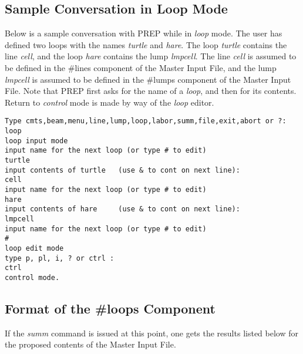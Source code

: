 \subsection{Sample Conversation in Loop Mode} Below is a sample
conversation with PREP while in {\em loop} mode. The user has defined two
loops with the names {\em turtle} and {\em hare}. The loop {\em turtle }
contains the line {\em cell}, and the loop {\em hare} contains the lump
{\em lmpcell}. The line {\em cell} is assumed to be defined in the \#lines
component of the Master Input File, and the lump {\em lmpcell} is assumed
to be defined in the \#lumps component of the Master Input File. Note that
PREP first asks for the name of a {\em loop}, and then for its contents.
Return to {\em control} mode is made by way of the {\em loop} editor.

\begin{footnotesize}
\begin{verbatim}
Type cmts,beam,menu,line,lump,loop,labor,summ,file,exit,abort or ?:
loop
loop input mode
input name for the next loop (or type # to edit)
turtle
input contents of turtle   (use & to cont on next line):
cell
input name for the next loop (or type # to edit)
hare
input contents of hare     (use & to cont on next line):
lmpcell
input name for the next loop (or type # to edit)
#
loop edit mode
type p, pl, i, ? or ctrl :
ctrl
control mode.
\end{verbatim}
\end{footnotesize}

\subsection{Format of the \#loops Component} If the {\em summ} command is
issued at this point, one gets the results listed below for the proposed
contents of the Master Input File.

